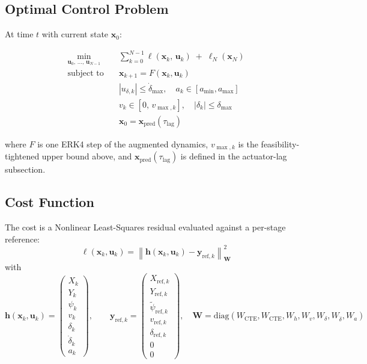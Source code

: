 \documentclass[11pt]{article}
\begin{document}
\subsection{Optimal Control Problem}

At time $t$ with current state $\bm{x}_0$:

\begin{align}
\min_{\bm{u}_0,\,\dots,\,\bm{u}_{N-1}} \quad
  &\sum_{k=0}^{N-1} \ell(\bm{x}_k,\, \bm{u}_k)
  \;+\; \ell_N(\bm{x}_N) \label{eq:ocp}\\
\text{subject to} \quad
  &\bm{x}_{k+1} = F(\bm{x}_k, \bm{u}_k) \tag{dynamics}\\
  &|u_{\delta,k}| \leq \dot{\delta}_{\max},\quad a_k \in [a_{\min}, a_{\max}] \tag{input bounds}\\
  &v_k \in [0,\, v_{\max,k}],\quad |\delta_k| \leq \delta_{\max} \tag{state bounds}\\
  &\bm{x}_0 = \bm{x}_{\text{pred}}(\tau_{\text{lag}}) \tag{lag-compensated initial condition}
\end{align}

where $F$ is one ERK4 step of the augmented dynamics, $v_{\max,k}$ is the
feasibility-tightened upper bound above, and
$\bm{x}_{\text{pred}}(\tau_{\text{lag}})$ is defined in the actuator-lag
subsection.

\subsection{Cost Function}

The cost is a Nonlinear Least-Squares residual evaluated against a per-stage
reference:
\[
\ell(\bm{x}_k, \bm{u}_k)
  = \left\|\bm{h}(\bm{x}_k,\bm{u}_k) - \bm{y}_{\text{ref},k}\right\|_{\bm{W}}^2
\]
with
\[
\bm{h}(\bm{x}_k,\bm{u}_k) =
  \begin{pmatrix} X_k \\ Y_k \\ \psi_k \\ v_k \\ \delta_k \\ \dot{\delta}_k \\ a_k \end{pmatrix},
\qquad
\bm{y}_{\text{ref},k} =
  \begin{pmatrix} X_{\text{ref},k} \\ Y_{\text{ref},k} \\ \tilde{\psi}_{\text{ref},k} \\ v_{\text{ref},k} \\ \delta_{\text{ref},k} \\ 0 \\ 0 \end{pmatrix},
\quad
\bm{W} = \mathrm{diag}(W_{\text{CTE}}, W_{\text{CTE}}, W_h, W_v,
                       W_\delta, W_{\dot\delta}, W_a)
\]
\end{document}
